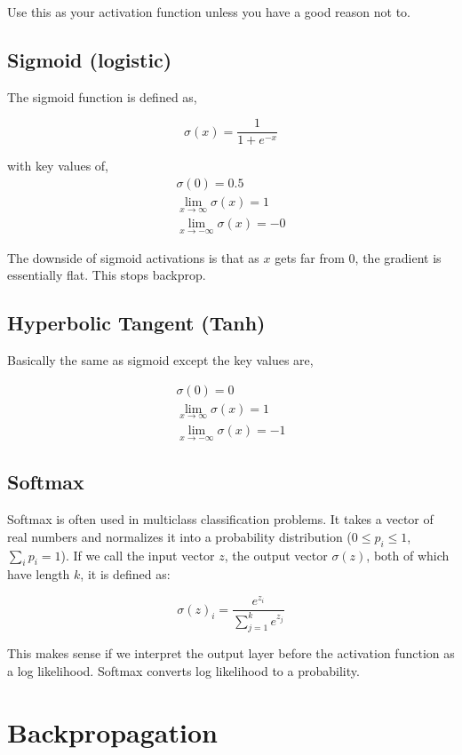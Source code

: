 \documentclass{article}
\begin{document}
Use this as your activation function unless you have a good reason not to.

\subsection{Sigmoid (logistic)}

The sigmoid function is defined as,

$$
\sigma(x) = \frac{1}{1 + e^{-x}}
$$

\noindent
with key values of,
\begin{align}
    \sigma(0) = 0.5 \\
    \lim_{x \to \infty} \sigma(x) = 1 \\
    \lim_{x \to -\infty} \sigma(x) = -0
\end{align}

\noindent
The downside of sigmoid activations is that as $x$ gets far from $0$, the gradient is essentially flat. This stops backprop.

\subsection{Hyperbolic Tangent (Tanh)}

Basically the same as sigmoid except the key values are,

\begin{align}
    \sigma(0) = 0 \\
    \lim_{x \to \infty} \sigma(x) = 1 \\
    \lim_{x \to -\infty} \sigma(x) = -1
\end{align}

\subsection{Softmax}

Softmax is often used in multiclass classification problems. It takes a vector of real numbers and normalizes it into a probability distribution ($0 \leq p_i \leq 1$, $\sum_{i} p_i = 1$). If we call the input vector $z$, the output vector $\sigma(z)$, both of which have length $k$, it is defined as:

$$
\sigma(z)_i = \frac{ e^{z_i} }{ \sum_{j=1}^{k} e^{z_j} }
$$

This makes sense if we interpret the output layer before the activation function as a log likelihood. Softmax converts log likelihood to a probability.


\section{Backpropagation}
\end{document}
